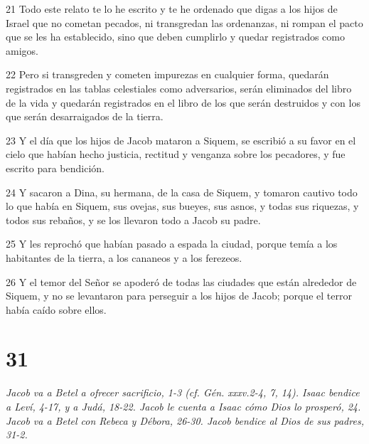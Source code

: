 \par 21 Todo este relato te lo he escrito y te he ordenado que digas a los hijos de Israel que no cometan pecados, ni transgredan las ordenanzas, ni rompan el pacto que se les ha establecido, sino que deben cumplirlo y quedar registrados como amigos.
\par 22 Pero si transgreden y cometen impurezas en cualquier forma, quedarán registrados en las tablas celestiales como adversarios, serán eliminados del libro de la vida y quedarán registrados en el libro de los que serán destruidos y con los que serán desarraigados de la tierra.
\par 23 Y el día que los hijos de Jacob mataron a Siquem, se escribió a su favor en el cielo que habían hecho justicia, rectitud y venganza sobre los pecadores, y fue escrito para bendición.
\par 24 Y sacaron a Dina, su hermana, de la casa de Siquem, y tomaron cautivo todo lo que había en Siquem, sus ovejas, sus bueyes, sus asnos, y todas sus riquezas, y todos sus rebaños, y se los llevaron todo a Jacob su padre.
\par 25 Y les reprochó que habían pasado a espada la ciudad, porque temía a los habitantes de la tierra, a los cananeos y a los ferezeos.
\par 26 Y el temor del Señor se apoderó de todas las ciudades que están alrededor de Siquem, y no se levantaron para perseguir a los hijos de Jacob; porque el terror había caído sobre ellos.

\chapter{31}

\par \textit{Jacob va a Betel a ofrecer sacrificio, 1-3 (cf. Gén. xxxv.2-4, 7, 14). Isaac bendice a Leví, 4-17, y a Judá, 18-22. Jacob le cuenta a Isaac cómo Dios lo prosperó, 24. Jacob va a Betel con Rebeca y Débora, 26-30. Jacob bendice al Dios de sus padres, 31-2.}

